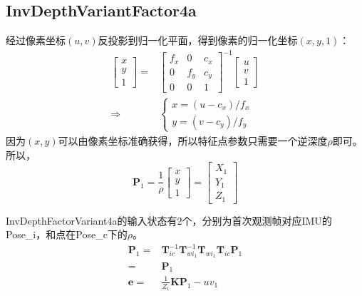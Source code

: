 \documentclass{article}
\begin{document}
\subsection{InvDepthVariantFactor4a}
经过像素坐标$(u,v)$反投影到归一化平面，得到像素的归一化坐标$(x,y,1)$：
\begin{equation}
	\begin{aligned}
		\left[
		\begin{matrix}
		x\\
		y\\
		1
		\end{matrix}
		\right]
		=&
		\left[
		\begin{matrix}
		f_x & 0   & c_x \\
		0   & f_y & c_y \\
		0   & 0   & 1   
		\end{matrix}
		\right]^{-1}
		\left[
		\begin{matrix}
		u\\
		v\\
		1
		\end{matrix}
		\right] \\
		\Rightarrow &
		\left\{
		\begin{aligned}
		x=(u-c_x)/f_x\\
		y=(v-c_y)/f_y
	\end{aligned}
	\right.
	\end{aligned}
\end{equation}
因为$(x,y)$可以由像素坐标准确获得，所以特征点参数只需要一个逆深度$\rho$即可。
所以，
\begin{equation}
	\boldsymbol{P}_1=\frac{1}{\rho}
	\left[
		\begin{matrix}
			x \\
			y \\
			1 
		\end{matrix}
	\right]=
	\left[
		\begin{matrix}
			X_1 \\
			Y_1 \\
			Z_1 
		\end{matrix}
	\right]
\end{equation}

InvDepthFactorVariant4a的输入状态有2个，分别为首次观测帧对应IMU的Pose\_i，和点在Pose\_c下的$\rho$。
$$
\begin{aligned}
	\boldsymbol{P}_1  =& \boldsymbol{T}_{ic}^{-1}\boldsymbol{T}_{wi_1}^{-1}\boldsymbol{T}_{wi_1}\boldsymbol{T}_{ic}\boldsymbol{P}_1 \\=&
	\boldsymbol{P}_1 \\
	\boldsymbol{e}    =& \frac{1}{Z_1}\boldsymbol{K} \boldsymbol{P}_1-uv_1     
\end{aligned}
$$
\end{document}
